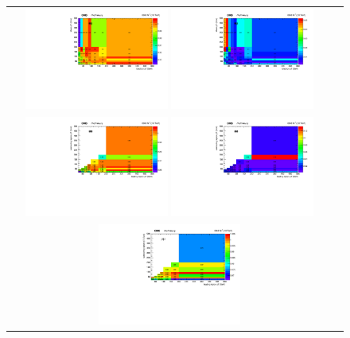 \begin{figure}[!htb]
  \begin{center}
    \begin{tabular}{cc}
      \includegraphics[width=0.45\textwidth]{fig_2018_TrigSF/h2D_lepABpt_emu.pdf}
      \includegraphics[width=0.45\textwidth]{fig_2018_TrigSF/h2D_lepABpt_emu_BinErrors.pdf}\\       
      \includegraphics[width=0.45\textwidth]{fig_2018_TrigSF/h2D_lepABpt_ee.pdf}
      \includegraphics[width=0.45\textwidth]{fig_2018_TrigSF/h2D_lepABpt_ee_BinErrors.pdf}\\
      \includegraphics[width=0.45\textwidth]{fig_2018_TrigSF/h2D_lepABpt_mumu.pdf}

\end{tabular}
\end{center}
\end{figure}
